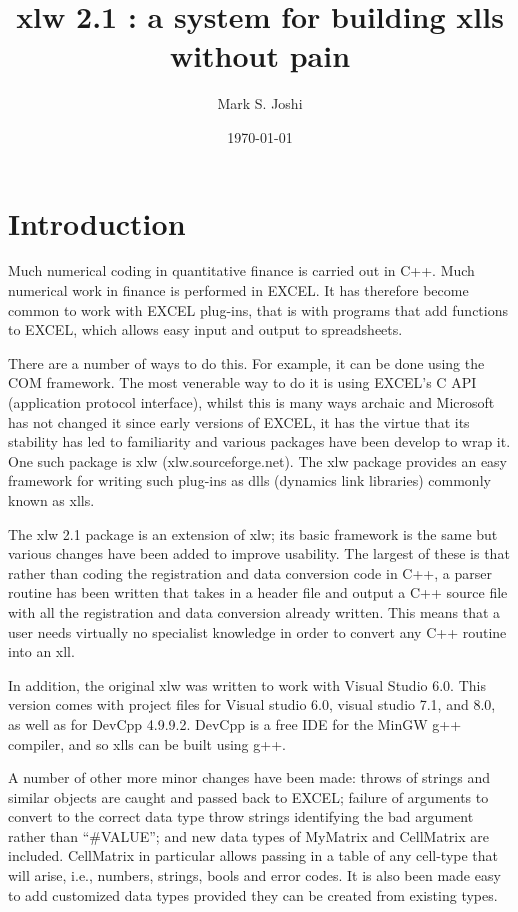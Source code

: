 \documentclass[12pt,reqno]{amsart}
\title[xlw 2,1]{
xlw 2.1 : a system for building xlls without pain
}
\author{Mark S. Joshi}
\date {\today}
\numberwithin{equation}{section}
\numberwithin{figure}{section}
\begin{document}
\maketitle
\section{Introduction}
Much numerical coding in quantitative finance is carried out in
C++. Much numerical work in finance is performed in EXCEL. It has
therefore become common to work with EXCEL plug-ins, that is with
programs that add functions to EXCEL, which allows easy input and output
to spreadsheets.

There are a number of ways to do this. For example, it can be done
using the COM framework. The most venerable way to do it is using
EXCEL's C API (application protocol interface), whilst this is many
ways archaic and Microsoft has not changed it since early versions of
EXCEL, it has the virtue that its stability has led to familiarity and
various packages have been develop to wrap it. One such package is xlw
(xlw.sourceforge.net). The xlw package provides an easy framework for
writing such plug-ins as dlls (dynamics link libraries) commonly known
as xlls. 

The xlw 2.1 package is an extension of xlw; its basic framework is
the same but various changes have been added to improve usability. The
largest of these is that rather than coding the registration and data
conversion code in
C++, a parser routine has been written that takes in a header file and
output a C++ source file with all the registration and data conversion
already written. This means that a user needs virtually no specialist
knowledge in order to convert any C++ routine into an xll.  

In addition, the original xlw was written to work with Visual Studio
6.0. This version comes with project files for Visual studio 6.0, visual studio 7.1, and 
8.0, as well as for DevCpp 4.9.9.2. DevCpp is a free IDE for the MinGW
g++ compiler, and so xlls can be built using g++. 

A number of other more minor changes have been made: throws of strings and
similar objects are caught and passed back to EXCEL; failure of
arguments to convert to the correct data type throw strings
identifying the bad argument rather than ``\#VALUE''; and new data
types of MyMatrix and CellMatrix are included. CellMatrix in
particular allows passing in a table of any cell-type that will arise,
i.e., numbers, strings, bools and error codes. It is also been made
easy to add customized data types provided they can be created from
existing types. 
\end{document}
